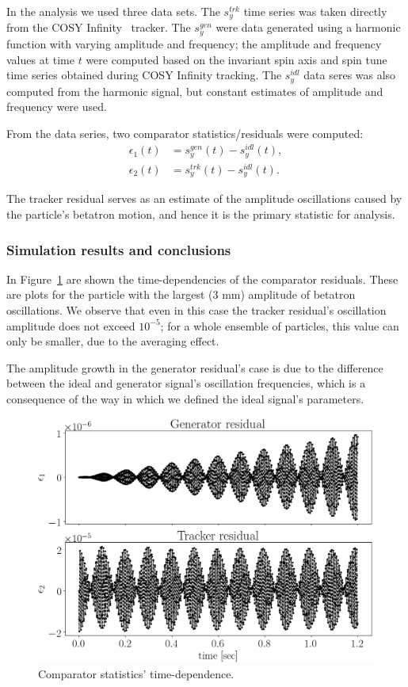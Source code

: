 \documentclass[preprint, review]{elsarticle}
\begin{document}
In the analysis we used three data sets. The $s_y^{trk}$ time series was taken directly
from the COSY Infinity~\cite{COSYInf} tracker. The $s_y^{gen}$ were data generated using a harmonic function
with varying amplitude and frequency; the amplitude and frequency values at time $t$ were computed based
on the invariant spin axis and spin tune time series obtained during COSY Infinity tracking.
The $s_y^{idl}$ data seres was also computed from the harmonic signal, but constant estimates of
amplitude and frequency were used.

From the data series, two comparator statistics/residuals were computed:
\begin{align*}
  \epsilon_1(t) &= s_y^{gen}(t) - s_y^{idl}(t), \tag{generator residual}\\
  \epsilon_2(t) &= s_y^{trk}(t) - s_y^{idl}(t). \tag{tracker residual}
\end{align*}

The tracker residual serves as an estimate of the amplitude oscillations
caused by the particle's betatron motion, and hence it is the primary statistic for analysis.

\subsubsection{Simulation results and conclusions}

In Figure~\ref{fig:smp:resid_vs_time} are shown the time-dependencies of the comparator
residuals. These are plots for the particle with the largest (3 mm) amplitude of betatron oscillations.
We observe that even in this case the tracker residual's oscillation amplitude does not exceed
$10^{-5}$; for a whole ensemble of particles, this value can only be smaller, due to the averaging effect.

The amplitude growth in the generator residual's case is due to the difference between the ideal
and generator signal's oscillation frequencies, which is a consequence of the way in which we defined the
ideal signal's parameters.
\begin{figure}[h]
  \includegraphics[width=\linewidth]{img/smp_sim/residual_vs_time(both)}
  \caption{Comparator statistics' time-dependence.\label{fig:smp:resid_vs_time}}
\end{figure}
\end{document}
